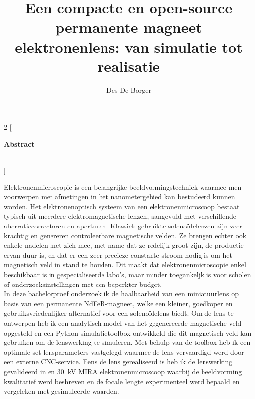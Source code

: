 \documentclass[we,twoside,openright,a4paper,11pt]{uantwerpenbamathesis}
\title{Een compacte en open-source permanente magneet elektronenlens: van simulatie tot realisatie} %
\subtitle{}
\author{Des De Borger}
\begin{document}
\maketitle

\frontmatter

\tableofcontents

\mainmatter

\pagestyle{empty}
\thispagestyle{empty}

\makeatletter
\begin{multicols}{2}
[
\begin{center}
\textbf{
  \Large Abstract\\[1ex]
  \@title\\[1ex]
  \large \@author
}
\end{center}
]

Elektronenmicroscopie is een belangrijke beeldvormingstechniek waarmee men voorwerpen met afmetingen in het nanometergebied kan bestudeerd kunnen worden. Het elektronenoptisch systeem van een elektronenmicroscoop bestaat typisch uit meerdere elektromagnetische lenzen, aangevuld met verschillende aberratiecorrectoren en aperturen. Klassiek gebruikte solenoïdelenzen zijn zeer krachtig en genereren controleerbare magnetische velden. Ze brengen echter ook enkele nadelen met zich mee, met name dat ze redelijk groot zijn, de productie ervan duur is, en dat er een zeer precieze constante stroom nodig is om het magnetisch veld in stand te houden. Dit maakt dat elektronenmicroscopie enkel beschikbaar is in gespecialiseerde labo's, maar minder toegankeljk is voor scholen of onderzoeksinstellingen met een beperkter budget.\\

In deze bachelorproef onderzoek ik de haalbaarheid van een miniatuurlens op basis van een permanente NdFeB-magneet, welke een kleiner, goedkoper en gebruiksvriedenlijker alternatief voor een solenoïdelens biedt. Om de lens te ontwerpen heb ik een analytisch model van het gegenereerde magnetische veld opgesteld en een Python simulatietoolbox ontwikkeld die dit magnetisch veld kan gebruiken om de lenswerking te simuleren. Met behulp van de toolbox heb ik een optimale set lensparameters vastgelegd waarmee de lens vervaardigd werd door een externe CNC-service. Eens de lens gerealiseerd is heb ik de lenswerking gevalideerd in en $30$~kV MIRA elektronenmicroscoop waarbij de beeldvorming kwalitatief werd beshreven en de focale lengte experimenteel werd bepaald en vergeleken met gesimuleerde waarden.\\


\end{multicols}
\end{document}
